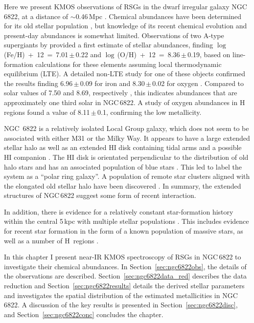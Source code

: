 Here we present KMOS observations of RSGs in the dwarf irregular galaxy NGC\,6822,
at a distance of $\sim$0.46\,Mpc
\citep[][and references therein]{2012AJ....144....4M}.
Chemical abundances have been determined for its old stellar population
\citep[e.g.][]{2001MNRAS.327..918T,2013ApJ...779..102K},
but knowledge of its recent chemical evolution and present-day abundances is
somewhat limited.
Observations of two A-type supergiants by
\cite{2001ApJ...547..765V} provided a first estimate of stellar abundances, finding
$\log$\,(Fe/H)~+~12~=~7.01\,$\pm$\,0.22 and
$\log$\,(O/H)~+~12~=~8.36\,$\pm$\,0.19, based on line-formation calculations for these elements
assuming local thermodynamic equilibrium (LTE).
A detailed non-LTE study for one of these objects confirmed the results finding
6.96\,$\pm$\,0.09 for iron and 8.30\,$\pm$\,0.02 for oxygen
\citep{2002PhDT.........3P}.
Compared to solar values of 7.50 and 8.69, respectively
\citep{2009ARA&A..47..481A},
this indicates abundances that are approximately one third solar in NGC\,6822.
A study of oxygen abundances in H\,\2 regions
\citep{2006ApJ...642..813L} found a value of 8.11\,$\pm$\,0.1, confirming the low metallicity.

NGC\, 6822 is a relatively isolated Local Group galaxy, which does not seem to be associated with either M31 or the Milky Way.
It appears to have a large extended stellar halo
\citep{2002AJ....123..832L,2014ApJ...783...49H}
as well as an extended HI disk containing tidal arms and a possible HI companion
\citep{2000ApJ...537L..95D}.
The HI disk is orientated perpendicular to the distribution of old halo stars and has an associated population of blue stars
\citep{2003MNRAS.341L..39D,2003ApJ...590L..17K}.
This led \cite{2006ApJ...636L..85D} to label the system as a ``polar ring galaxy''.
A population of remote star clusters aligned with the elongated old stellar halo have been discovered
\citep{2011ApJ...738...58H,2013MNRAS.429.1039H}.
In summary, the extended structures of NGC\,6822 suggest some form of recent interaction.

In addition, there is evidence for a relatively constant star-formation history within the central 5\,kpc
\citep{2014ApJ...789..147W}
with multiple stellar populations
\citep{2006A&A...451...99B,2012A&A...540A.135S}.
This includes evidence for recent star formation in the form of a known population of massive stars, as well as a number of H\,\2 regions
\citep{2001ApJ...547..765V,2006AJ....131..343D,2009A&A...505.1027H,2012AJ....144....2L}.

In this chapter I present near-IR KMOS spectroscopy of RSGs in NGC\,6822 to investigate their chemical abundances.
In Section~\ref{sec:ngc6822obs}, the details of the observations are described.
Section~\ref{sec:ngc6822data_red} describes the data reduction and
Section~\ref{sec:ngc6822results} details the derived stellar parameters and investigates the spatial distribution of the estimated metallicities in NGC\,6822.
A discussion of the key results is presented in Section~\ref{sec:ngc6822disc}, and
Section~\ref{sec:ngc6822conc} concludes the chapter.

